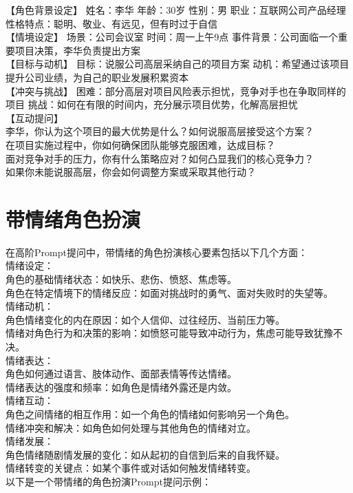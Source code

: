 \documentclass[12pt]{book}
\begin{document}
【角色背景设定】 姓名：李华 年龄：30岁 性别：男 职业：互联网公司产品经理 性格特点：聪明、敬业、有远见，但有时过于自信\\

【情境设定】 场景：公司会议室 时间：周一上午9点 事件背景：公司面临一个重要项目决策，李华负责提出方案\\

【目标与动机】 目标：说服公司高层采纳自己的项目方案 动机：希望通过该项目提升公司业绩，为自己的职业发展积累资本\\

【冲突与挑战】 困难：部分高层对项目风险表示担忧，竞争对手也在争取同样的项目 挑战：如何在有限的时间内，充分展示项目优势，化解高层担忧\\

【互动提问】\\

李华，你认为这个项目的最大优势是什么？如何说服高层接受这个方案？\\
在项目实施过程中，你如何确保团队能够克服困难，达成目标？\\
面对竞争对手的压力，你有什么策略应对？如何凸显我们的核心竞争力？\\
如果你未能说服高层，你会如何调整方案或采取其他行动？\\

\section{带情绪角色扮演}
在高阶Prompt提问中，带情绪的角色扮演核心要素包括以下几个方面：\\

情绪设定：\\
角色的基础情绪状态：如快乐、悲伤、愤怒、焦虑等。\\
角色在特定情境下的情绪反应：如面对挑战时的勇气、面对失败时的失望等。\\
情绪动机：\\
角色情绪变化的内在原因：如个人信仰、过往经历、当前压力等。\\
情绪对角色行为和决策的影响：如愤怒可能导致冲动行为，焦虑可能导致犹豫不决。\\
情绪表达：\\
角色如何通过语言、肢体动作、面部表情等传达情绪。\\
情绪表达的强度和频率：如角色是情绪外露还是内敛。\\
情绪互动：\\
角色之间情绪的相互作用：如一个角色的情绪如何影响另一个角色。\\
情绪冲突和解决：如角色如何处理与其他角色的情绪对立。\\
情绪发展：\\
角色情绪随剧情发展的变化：如从起初的自信到后来的自我怀疑。\\
情绪转变的关键点：如某个事件或对话如何触发情绪转变。\\
以下是一个带情绪的角色扮演Prompt提问示例：\\
\end{document}

